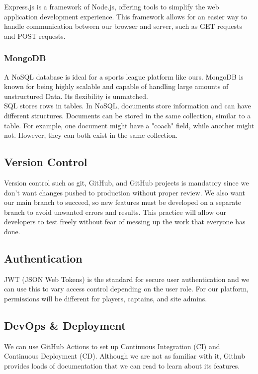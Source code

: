 \documentclass{article}
\begin{document}
\noindent Express.js is a framework of Node.js, offering tools to simplify the web application development experience. This framework allows for an easier way to handle communication between our browser and server, such as GET requests and POST requests.

\subsubsection*{MongoDB}

A NoSQL database is ideal for a sports league platform like ours. MongoDB is known for being highly scalable and capable of handling large amounts of unstructured Data. Its flexibility is unmatched. \\

\noindent SQL stores rows in tables. In NoSQL, documents store information and can have different structures. Documents can be stored in the same collection, similar to a table. For example, one document might have a "coach" field, while another might not. However, they can both exist in the same collection.

\subsection*{Version Control}

Version control such as git, GitHub, and GitHub projects is mandatory since we don't want changes pushed to production without proper review. We also want our main branch to succeed, so new features must be developed on a separate branch to avoid unwanted errors and results. This practice will allow our developers to test freely without fear of messing up the work that everyone has done.

\subsection*{Authentication}

JWT (JSON Web Tokens) is the standard for secure user authentication and we can use this to vary access control depending on the user role. For our platform, permissions will be different for players, captains, and site admins.

\subsection*{DevOps \& Deployment}

We can use GitHub Actions to set up Continuous Integration (CI) and Continuous Deployment (CD). Although we are not as familiar with it, Github provides loads of documentation that we can read to learn about its features.\\
\end{document}
